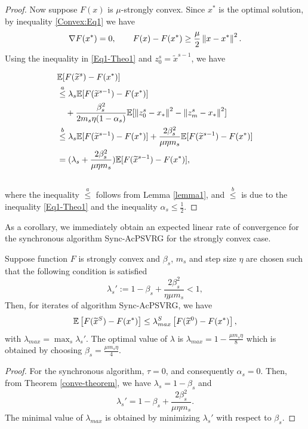 \begin{proof}
Now suppose $F(x)$ is $\mu$-strongly convex. Since $x^*$ is the optimal solution, by inequality \eqref{Convex:Eq1} we have 
\begin{equation}\label{Eq1-Theo1}
\nabla F(x^*) = 0,\qquad F(x)-F(x^*) \geq \frac{\mu}{2} \left\lVert x-x^*\right\rVert^2.
\end{equation}
Using the inequality in \eqref{Eq1-Theo1} and $z_0^s = \widetilde{x}^{s-1}$, we have 

\begin{equation}
\begin{split}
&\mathbb{E} [F(\widetilde{x}^s)-F(x^*)]\\
&\stackrel{a}{\leq}\lambda_s\mathbb{E}[F(\widetilde{x}^{s-1})-F(x^*)]\\
&~~~+ {\frac{ \beta_s^2}{2 m_s\eta(1-\alpha_s)}}\mathbb{E}[\left\lVert z_{0}^s-x_*\right\rVert^2-\left\lVert z_{m}^s-x_*\right\rVert^2]\\
&\stackrel{b}{\leq}\lambda_s\mathbb{E}[F(\widetilde{x}^{s-1})-F(x^*)]+ {\frac{2  \beta_s^2}{\mu\eta m_s}}\mathbb{E}[F(\widetilde{x}^{s-1})-F(x^*)]\\
&=(\lambda_s+{\frac{2  \beta_s^2}{\mu\eta m_s}})\mathbb{E}[F(\widetilde{x}^{s-1})-F(x^*)],
\end{split}
\end{equation}\\
where the inequality $\stackrel{a}{\leq}$ follows from Lemma \ref{lemma1}, and $\stackrel{b}{\leq}$ is due to the inequality \eqref{Eq1-Theo1} and the inequality $\alpha_s\leq \frac{1}{2}$. 
\end{proof}
As a corollary, we immediately obtain an expected linear rate of convergence for the synchronous algorithm Sync-AcPSVRG for the strongly convex case.
\begin{corollary}\label{cor-syn}
Suppose function $F$ is strongly convex and $\beta_s$, $m_s$ and step size $\eta$ are chosen
such that the following condition is satisfied
\[
\lambda_s' := 1-\beta_s+{\frac{2\beta_s^2}{\eta\mu m_s}} < 1,
\]
Then, for iterates of algorithm Sync-AcPSVRG, we have
\begin{equation}
\mathbb{E}\left[F(\widetilde{x}^S)-F(x^*)\right]\leq \lambda_{max}^S\left[F(\widetilde{x}^0)-F(x^*)\right], 
\end{equation}
with $\lambda_{max} = \max_{s}{\lambda_s'}$. The optimal value of $\lambda$ is $\lambda_{max} = 1-\frac{\mu m_s\eta}{8}$ which is obtained by choosing ${\beta_s=\frac{\mu m_s\eta}{4}}$.
\end{corollary}
\begin{proof}
For the synchronous algorithm, $\tau=0$, and consequently $\alpha_s=0$. Then, from Theorem \ref{conve-theorem}, we have $\lambda_s = 1-\beta_s$ and 
\[
\lambda_s' = 1-\beta_s+{\frac{2  \beta_s^2}{\mu\eta m_s}}.\]
The minimal value of $\lambda_{max}$ is obtained by minimizing $\lambda_s'$ with respect to $\beta_s$.
\end{proof}

